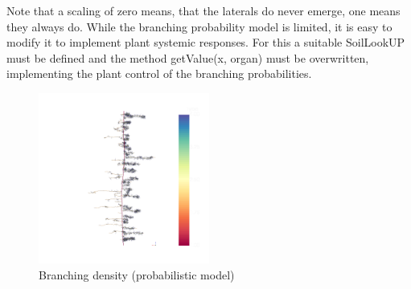 Note that a scaling of zero means, that the laterals do never emerge, one means they always do. While the branching probability model is limited, it is easy to modify it to implement plant systemic responses. For this a suitable SoilLookUP must be defined and the method getValue(x, organ) must be overwritten, implementing the plant control of the branching probabilities. 

\begin{figure}
\centering
\includegraphics[width=0.5\textwidth]{example5d.png}
\caption{Branching density (probabilistic model)} \label{fig:probability}
\end{figure}
